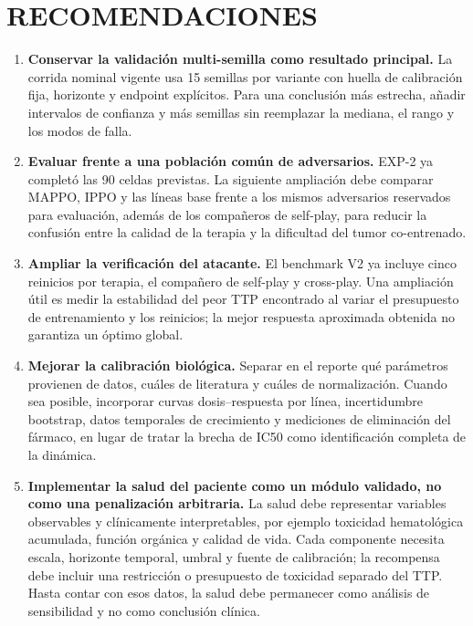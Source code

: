 \chapter*{\center \Large RECOMENDACIONES}

\begin{enumerate}
  \item \textbf{Conservar la validación multi-semilla como resultado principal.} La corrida nominal vigente usa 15 semillas por variante con huella de calibración fija, horizonte y endpoint explícitos. Para una conclusión más estrecha, añadir intervalos de confianza y más semillas sin reemplazar la mediana, el rango y los modos de falla.

  \item \textbf{Evaluar frente a una población común de adversarios.} EXP-2 ya completó las 90 celdas previstas. La siguiente ampliación debe comparar MAPPO, IPPO y las líneas base frente a los mismos adversarios reservados para evaluación, además de los compañeros de self-play, para reducir la confusión entre la calidad de la terapia y la dificultad del tumor co-entrenado.

  \item \textbf{Ampliar la verificación del atacante.} El benchmark V2 ya incluye cinco reinicios por terapia, el compañero de self-play y cross-play. Una ampliación útil es medir la estabilidad del peor TTP encontrado al variar el presupuesto de entrenamiento y los reinicios; la mejor respuesta aproximada obtenida no garantiza un óptimo global.

  \item \textbf{Mejorar la calibración biológica.} Separar en el reporte qué parámetros provienen de datos, cuáles de literatura y cuáles de normalización. Cuando sea posible, incorporar curvas dosis--respuesta por línea, incertidumbre bootstrap, datos temporales de crecimiento y mediciones de eliminación del fármaco, en lugar de tratar la brecha de IC50 como identificación completa de la dinámica.

  \item \textbf{Implementar la salud del paciente como un módulo validado, no como una penalización arbitraria.} La salud debe representar variables observables y clínicamente interpretables, por ejemplo toxicidad hematológica acumulada, función orgánica y calidad de vida. Cada componente necesita escala, horizonte temporal, umbral y fuente de calibración; la recompensa debe incluir una restricción o presupuesto de toxicidad separado del TTP. Hasta contar con esos datos, la salud debe permanecer como análisis de sensibilidad y no como conclusión clínica.


\end{enumerate}
